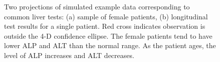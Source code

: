 \documentclass[
  12pt,
]{interact}
\begin{document}
\begin{figure}

\begin{minipage}{0.50\linewidth}



\end{minipage}%
%
\begin{minipage}{0.50\linewidth}



\end{minipage}%

\caption{\label{fig-liver}Two projections of simulated example data
corresponding to common liver tests: (a) sample of female patients, (b)
longitudinal test results for a single patient. Red cross indicates
observation is outside the 4-D confidence ellipse. The female patients
tend to have lower ALP and ALT than the normal range. As the patient
ages, the level of ALP increases and ALT decreases.}

\end{figure}%
\end{document}
